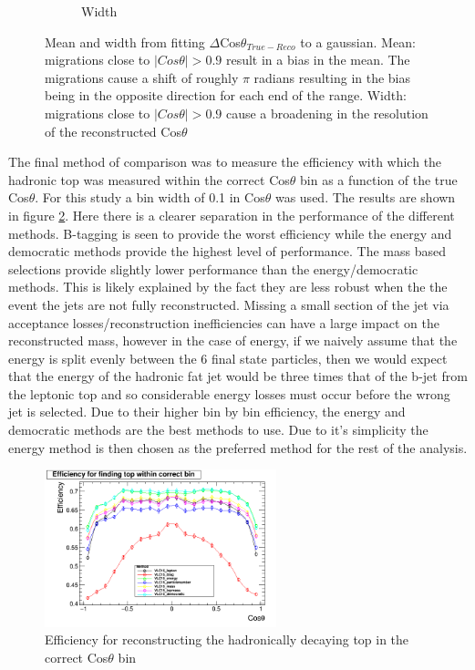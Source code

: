 \begin{figure}
\begin{subfigure}{.5\textwidth}
    \caption[Width]{Width}
  \end{subfigure}
  \caption[Mean and width from fitting $\Delta Cos\theta_{True-Reco}$ to a gaussian]{Mean and width from fitting $\Delta$Cos$\theta_{True-Reco}$ to a gaussian. Mean: migrations close to $\mid Cos\theta\mid>0.9$ result in a bias in the mean. The migrations cause a shift of roughly $\pi$ radians resulting in the bias being in the opposite direction for each end of the range. Width: migrations close to $\mid Cos\theta\mid>0.9$ cause a broadening in the resolution of the reconstructed Cos$\theta$}
  \label{fig:angleFitDiff}
\end{figure}

The final method of comparison was to measure the efficiency with which the hadronic top was measured within the correct Cos$\theta$ bin as a function of the true Cos$\theta$. For this study a bin width of 0.1 in Cos$\theta$ was used. The results are shown in figure \ref{fig:angularEfficiency}. Here there is a clearer separation in the performance of the different methods. B-tagging is seen to provide the worst efficiency while the energy and democratic methods provide the highest level of performance. The mass based selections provide slightly lower performance than the energy/democratic methods. This is likely explained by the fact they are less robust when the the event the jets are not fully reconstructed. Missing a small section of the jet via acceptance losses/reconstruction inefficiencies can have a large impact on the reconstructed mass, however in the case of energy, if we naively assume that the energy is split evenly between the 6 final state particles, then we would expect that the energy of the hadronic fat jet would be three times that of the b-jet from the leptonic top and so considerable energy losses must occur before the wrong jet is selected. Due to their higher bin by bin efficiency, the energy and democratic methods are the best methods to use. Due to it's simplicity the energy method is then chosen as the preferred method for the rest of the analysis. 

\begin{figure}
  \centering
  \includegraphics[width=0.6\textwidth]{TopAnalysis/figures/EfficiencyvsMCTheta.png}
  \caption[Efficiency for reconstructing the hadronically decaying top in the correct Cos$\theta$ bin]{Efficiency for reconstructing the hadronically decaying top in the correct Cos$\theta$ bin}
  \label{fig:angularEfficiency}
\end{figure}








